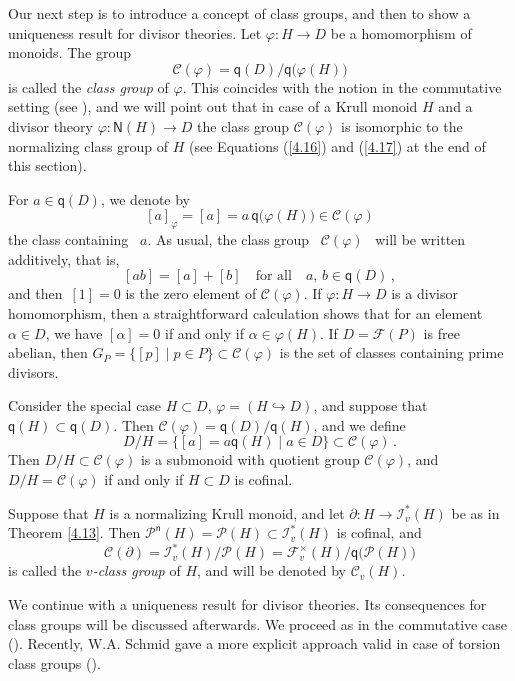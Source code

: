 \documentclass[a4paper]{amsart}
\theoremstyle{definition}
\numberwithin{equation}{section}
\begin{document}
\medskip
Our next step is to introduce a concept of class groups, and then to
show a uniqueness result for divisor theories. Let $\varphi \colon H
\to D$ be a homomorphism of monoids. The group
\[
\mathcal C (\varphi) = \mathsf q (D) /\mathsf q \bigl(\varphi (H)
\bigr)
\]
is called the  {\it class group}  of $\varphi$. This coincides with
the notion in the commutative setting (see \cite[Section
2.4]{Ge-HK06a}), and we will point out that in case of a Krull
monoid $H$ and a divisor theory $\varphi \colon \mathsf N (H) \to D$
the class group $\mathcal C (\varphi)$ is isomorphic to the
normalizing class group of $H$ (see Equations (\ref{4.16}) and
(\ref{4.17}) at the end of this section).

For $a \in \mathsf q(D)$, we denote by
\[
[a]_\varphi = [a] = a \, \mathsf q\bigl( \varphi (H) \bigr) \in
\mathcal C (\varphi)
\]
the class containing \ $a$.  As usual, the class group \ $\mathcal
C(\varphi)$ \ will be written additively, that is,
\[
[ab] = [a] + [b] \quad \text{for all} \quad a,\,b \in \mathsf
q(D)\,,
\]
and then \,$[1] = 0$ is the zero element of $\mathcal C(\varphi)$.
If $\varphi \colon H \to D$ is a divisor homomorphism, then a
straightforward calculation shows that for an element $\alpha \in
D$, we have $[\alpha] = 0$ if and only if $\alpha \in \varphi (H)$.
If $D = \mathcal F (P)$ is free abelian, then $G_P = \{[p] \mid p
\in P \} \subset \mathcal C (\varphi)$ is the set of classes
containing prime divisors.

Consider the special case $H \subset D$, $\varphi = (H
\hookrightarrow D)$, and suppose that $\mathsf q (H) \subset \mathsf
q (D)$. Then $\mathcal C (\varphi) = \mathsf q (D)/ \mathsf q (H)$,
and we define
\[
D/H = \{ [a] = a \mathsf q (H) \mid a \in D \} \subset \mathcal C
(\varphi) \,.
\]
Then $D/H \subset \mathcal C (\varphi)$ is a submonoid with quotient
group $\mathcal C ( \varphi)$, and $D/H = \mathcal C ( \varphi)$ if
and only if $H \subset D$ is cofinal.

Suppose that $H$ is a normalizing Krull monoid, and let $\partial
\colon H \to \mathcal I_v^* (H)$ be as in Theorem \ref{4.13}. Then
$\mathcal P^{\mathsf n} (H) = \mathcal P (H) \subset \mathcal I_v^*
(H)$ is cofinal, and
\[
\mathcal C (\partial) = \mathcal I_v^* (H)/ \mathcal P (H) =
\mathcal F_v^{\times}(H)/ \mathsf q \big( \mathcal P (H) \big)
\]
is called the {\it $v$-class group} of $H$, and will be denoted by
$\mathcal C_v (H)$.

We continue with a uniqueness result for divisor theories. Its
consequences for class groups will be discussed afterwards. We
proceed as in the commutative case (\cite[Section 2.4]{Ge-HK06a}).
Recently, W.A. Schmid gave a  more explicit approach valid in case
of torsion class groups (\cite[Section 3]{Sc10a}).
\end{document}

